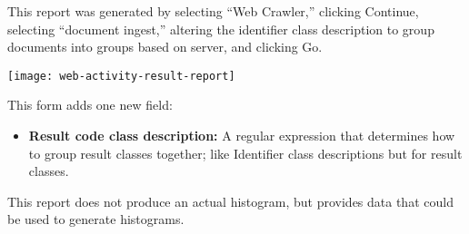 \begin{changemargin}{1.5in}{0in}
This report was generated by selecting ``Web Crawler,'' clicking Continue, selecting ``document ingest,''
altering the identifier class description to group documents into
groups based on server, and clicking Go.

\texttt{[image: web-activity-result-report]}

This form adds one new field:

\begin{itemize}

\item \textbf{Result code class description:} A regular expression that
determines how to group result classes together; like Identifier class
descriptions but for result classes.

\end{itemize}

This report does not produce an actual histogram, but provides data that
could be used to generate histograms.  

\end{changemargin}
